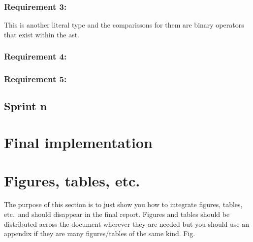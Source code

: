 \documentclass[a4paper, oneside, 11pt]{report}
\begin{document}
\subsubsection{Requirement 3: }
This is another literal type and the comparissons for them are binary operators that exist within the ast.
\subsubsection{Requirement 4: }
\subsubsection{Requirement 5: }

\subsection{Sprint n}


\section{Final implementation}

\section{Figures, tables, etc.}

The purpose of this section is to just show you how to integrate figures, tables, etc.\ and should disappear in the final report. Figures and tables should be distributed across the document wherever they are needed but you should use an appendix if they are many figures/tables of the same kind. Fig.\ %

\begin{figure}[htb]
\end{figure}


\begin{figure}[htb]
\end{figure}
\end{document}
